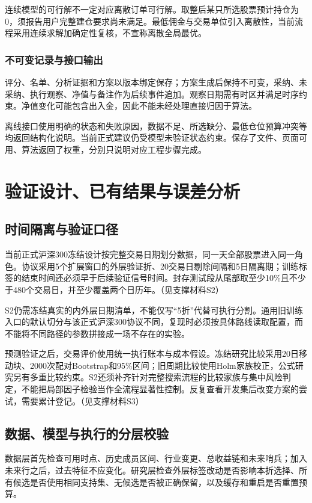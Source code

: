 \documentclass[UTF8,12pt,a4paper,fontset=none]{ctexart}
\begin{document}
连续模型的可行解不一定对应离散订单可行解。取整后某只所选股票预计持仓为0，须报告用户完整建仓要求尚未满足。最低佣金与交易单位引入离散性，当前流程采用连续求解加确定性复核，不宣称离散全局最优。


\subsubsection{不可变记录与接口输出}

评分、名单、分析证据和方案以版本绑定保存；方案生成后保持不可变，采纳、未采纳、执行观察、净值与备注作为后续事件追加。观察日期需有时区并满足时序约束。净值变化可能包含出入金，因此不能未经处理直接归因于算法。


离线接口使用明确的状态和失败原因，数据不足、所选缺分、最低仓位预算冲突等均返回结构化说明。当前正式建议仍受模型未验证状态约束。保存了文件、页面可用、算法返回了权重，分别只说明对应工程步骤完成。


\section{验证设计、已有结果与误差分析}

\subsection{时间隔离与验证口径}

当前正式沪深300冻结设计按完整交易日期划分数据，同一天全部股票进入同一角色。协议采用5个扩展窗口的外层验证折、20交易日剔除间隔和5日隔离期；训练标签的结束时间还必须早于后续验证信号时间。封存测试段从尾部取至少10\%且不少于480个交易日，并至少覆盖两个日历年。（见支撑材料S2）


S2仍需冻结真实的内外层日期清单，不能仅写“5折”代替可执行分割。通用旧训练入口的默认切分与该正式沪深300协议不同，复现时必须按具体路线读取配置，而不能将不同路径的参数拼接成一场不存在的实验。


预测验证之后，交易评价使用统一执行账本与成本假设。冻结研究比较采用20日移动块、2000次配对Bootstrap和95\%区间；旧周期比较使用Holm家族校正，公式研究另有多重比较约束。S2还须补齐针对完整搜索流程的比较家族与集中风险判定，不能把局部因子检验当作全流程显著性控制。反复查看开发集后改变方案的尝试，需要累计登记。\cite{r4}（见支撑材料S3）


\subsection{数据、模型与执行的分层校验}

数据层首先检查可用时点、历史成员区间、行业变更、总收益链和未来哨兵；加入未来行之后，过去特征不应变化。研究层检查外层标签改动是否影响本折选择、所有候选是否使用相同支持集、无候选是否被正确保留，以及缓存和重启是否重置预算。
\end{document}
